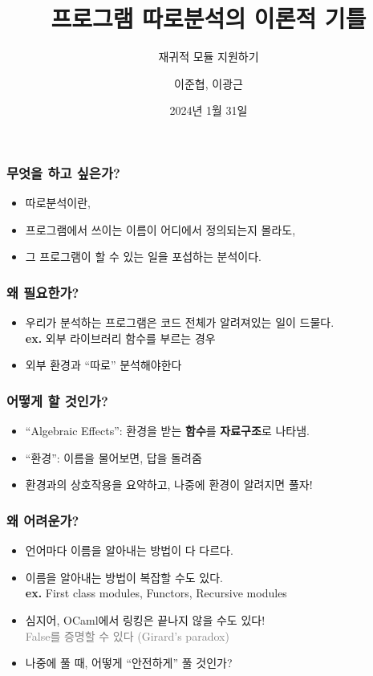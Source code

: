 \documentclass{beamer}
\title{프로그램 따로분석의 이론적 기틀}
\subtitle{재귀적 모듈 지원하기}
\author{이준협, 이광근}
\date{2024년 1월 31일}
\institute{2024년 SIGPL 겨울학교}
\theoremstyle{definition}
\begin{document}
\maketitle
\begin{frame}[c,fragile]
  \frametitle{무엇을 하고 싶은가?}
  \begin{itemize}
    \item 따로분석이란,
    \item 프로그램에서 쓰이는 이름이 어디에서 정의되는지 몰라도,
    \item 그 프로그램이 할 수 있는 일을 포섭하는 분석이다.
  \end{itemize}
\end{frame}
\begin{frame}[c,fragile]
  \frametitle{왜 필요한가?}
  \begin{itemize}
    \item 우리가 분석하는 프로그램은 코드 전체가 알려져있는 일이 드물다.\\
          \textbf{ex. }외부 라이브러리 함수를 부르는 경우
    \item 외부 환경과 ``따로'' 분석해야한다
  \end{itemize}
\end{frame}
\begin{frame}[c,fragile]
  \frametitle{어떻게 할 것인가?}
  \begin{itemize}
    \item ``Algebraic Effects'': 환경을 받는 \textbf{함수}를 \textbf{자료구조}로 나타냄.
    \item ``환경'': 이름을 물어보면, 답을 돌려줌
    \item 환경과의 상호작용을 요약하고, 나중에 환경이 알려지면 풀자!
  \end{itemize}
\end{frame}
\begin{frame}[c,fragile]
  \frametitle{왜 어려운가?}
  \begin{itemize}
    \item 언어마다 이름을 알아내는 방법이 다 다르다.
    \item 이름을 알아내는 방법이 복잡할 수도 있다.\\
          \textbf{ex. }First class modules, Functors, Recursive modules
    \item 심지어, OCaml에서 링킹은 끝나지 않을 수도 있다!\\
          \textcolor{gray}{False를 증명할 수 있다 (Girard's paradox)}
    \item 나중에 풀 때, 어떻게 ``안전하게'' 풀 것인가?
  \end{itemize}
\end{frame}
\end{document}
